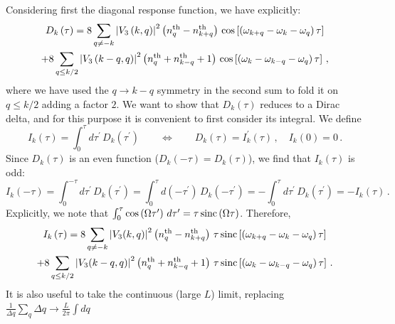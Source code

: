 \documentclass[aps,prd,notitlepage,amsfonts,amssymb,amsmath,nofootinbib,superscriptaddress,longbibliography]{revtex4-2}
\begin{document}
\begin{appendices}
Considering first the diagonal response function, we have explicitly:
\begin{multline}
\label{def:diagonal_response_function}
D_{k}\left(\tau\right) = 8 \sum_{q  \neq - k} \left|V_{3}\left(k,q\right)\right|^{2} \left( n_{q}^{\rm th} - n_{k+q}^{\rm th} \right) \, {\rm cos}\left[\left(\omega_{k+q}-\omega_{k}-\omega_{q}\right) \tau \right] \\
+ 8 \sum_{ q \leq k/2  } \left|V_{3}\left(k-q,q\right)\right|^{2} \left( n_{q}^{\rm th} + n_{k-q}^{\rm th} + 1 \right) \, {\rm cos}\left[\left(\omega_{k}-\omega_{k-q}-\omega_{q}\right) \tau \right] \, ,
\end{multline}
where we have used the $q \to k - q$ symmetry in the second sum to fold it on $q \leq k/2$ adding a factor $2$. We want to show that $D_{k}\left(\tau\right)$ reduces to a Dirac delta, and for this purpose it is convenient to first consider its integral. We define
\begin{equation}
    I_{k}(\tau) = \int_{0}^{\tau} d\tau^{\prime} \, D_{k}\left(\tau^{\prime}\right) \qquad \iff \qquad D_{k}(\tau) = I_{k}^{\prime}(\tau) \, , \quad I_{k}(0) = 0 \,.
\end{equation}
Since $D_{k}(\tau)$ is an even function ($D_{k}(-\tau) = D_{k}(\tau)$), we find that $I_{k}(\tau)$ is odd:
\begin{equation}
    I_{k}(-\tau) = \int_{0}^{-\tau} d\tau^{\prime}\,D_{k}\left(\tau^{\prime}\right) = \int_{0}^{\tau} d\left(-\tau^{\prime}\right)\,D_{k}\left(-\tau^{\prime}\right) = -\int_{0}^{\tau} d\tau^{\prime}\,D_{k}\left(\tau^{\prime}\right) = -I_{k}(\tau) \,.
\end{equation}
Explicitly, we note that $\int_{0}^{\tau} {\rm cos}\left(\Omega \tau^{\prime}\right) \, d\tau^{\prime} = \tau \, {\rm sinc}\left(\Omega \tau\right)$.  Therefore,
\begin{multline}
\label{eq:Ik_sinc_discrete}
    I_{k}\left(\tau\right) = 8 \sum_{q \neq - k} \left|V_{3}(k,q)\right|^{2} \left( n_{q}^{\rm th} - n_{k+q}^{\rm th} \right) \, \tau \, {\rm sinc}\left[\left(\omega_{k+q}-\omega_{k}-\omega_{q}\right) \tau \right] \\
    + 8 \sum_{ q \leq k/2  } \left|V_{3}(k-q,q)\right|^{2} \left(n_{q}^{\rm th} + n_{k-q}^{\rm th} + 1\right) \, \tau \, {\rm sinc}\left[\left(\omega_{k}-\omega_{k-q}-\omega_{q}\right) \tau \right] \,.
\end{multline}
It is also useful to take the continuous (large $L$) limit, replacing $\frac{1}{\Delta q} \sum_{q} \Delta q \to \frac{L}{2\pi} \int dq$
\begin{multline}

\end{multline}
\end{appendices}
\end{document}
